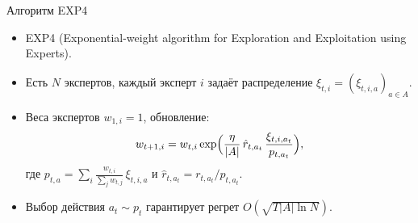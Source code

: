 \documentclass[10pt]{beamer}
\begin{document}
\begin{frame}{Алгоритм EXP4}
  \begin{itemize}
    \item EXP4 (Exponential-weight algorithm for Exploration and Exploitation using Experts).
    \item Есть $N$ экспертов, каждый эксперт $i$ задаёт распределение $\xi_{t,i}=(\xi_{t,i,a})_{a\in A}$.
    \item Веса экспертов $w_{1,i}=1$, обновление:
    \[ w_{t+1,i} = w_{t,i} \exp\Bigl(\frac{\eta}{|A|}\,\hat{r}_{t,a_t}\,\frac{\xi_{t,i,a_t}}{p_{t,a_t}}\Bigr), \]
    где $p_{t,a}=\sum_i \frac{w_{t,i}}{\sum_j w_{t,j}}\,\xi_{t,i,a}$ и $\hat{r}_{t,a_t}=r_{t,a_t}/p_{t,a_t}$.
    \item Выбор действия $a_t\sim p_t$ гарантирует регрет $O(\sqrt{T|A|\ln N})$.
  \end{itemize}
\end{frame}
\end{document}
